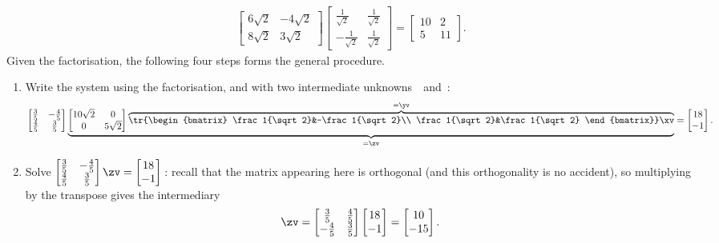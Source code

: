 \begin{example}
\begin{solution}
\begin{eqnarray*}
\begin{bmatrix} 6{\sqrt2}& -4{\sqrt2}
\\ 8{\sqrt2}&3{\sqrt2} \end{bmatrix}
\begin{bmatrix} \frac1{\sqrt2}&\frac1{\sqrt2}\\ -\frac1{\sqrt2}&\frac1{\sqrt2} \end{bmatrix}
=\begin{bmatrix} 10&2\\5&11 \end{bmatrix}.
\end{eqnarray*}
Given the factorisation, the following four steps forms the general procedure. 
\begin{enumerate}
\item Write the system using the factorisation, and with two intermediate unknowns~\yv\ and~\zv:
\begin{equation*}
\begin{bmatrix} \frac35&-\frac45\\\frac45&\frac35 \end{bmatrix}
\underbrace{\begin{bmatrix} 10\sqrt2&0\\0&5\sqrt2 \end{bmatrix}
\overbrace{\tr{\begin{bmatrix} \frac1{\sqrt2}&-\frac1{\sqrt2}\\ \frac1{\sqrt2}&\frac1{\sqrt2} \end{bmatrix}}\xv}^{=\yv}}_{=\zv}=\begin{bmatrix} 18\\-1 \end{bmatrix}.
\end{equation*}

\item Solve \(\begin{bmatrix} \frac35&-\frac45\\\frac45&\frac35 \end{bmatrix}\zv=\begin{bmatrix} 18\\-1 \end{bmatrix}\)\,: recall that the matrix appearing here is orthogonal (and this orthogonality is no accident), so multiplying by the transpose gives the intermediary
\begin{equation*}
\zv=\begin{bmatrix} \frac35&\frac45\\-\frac45&\frac35 \end{bmatrix}
\begin{bmatrix} 18\\-1 \end{bmatrix}
=\begin{bmatrix} 10\\-15 \end{bmatrix}.
\end{equation*}


\end{enumerate}
\end{solution}
\end{example}
